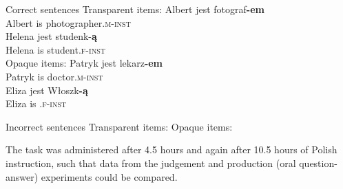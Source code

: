 \documentclass[output=paper,colorlinks,citecolor=brown,modfonts,nonflat]{../langscibook}
\begin{document}
\newpage

\ea%
    \label{ex:watorek:1}
    Correct sentences
    \ea%
    \label{ex:watorek:1a}
    Transparent items:
        \ea%
        \label{ex:watorek:1ai}
        \gll    Albert jest fotograf\textbf{{-em}}\\
                Albert is photographer\textsc{.m-inst}\\
        \ex%
        \label{ex:watorek:1aii}
        \gll    Helena jest studenk-\textbf{{ą}}\\
                Helena is student\textsc{.f-inst}\\
        \z
    \ex%
    \label{ex:watorek:1b}
    Opaque items:
        \ea%
        \label{ex:watorek:1bi}
        \gll    Patryk jest lekarz\textbf{{-em}}\\
                Patryk is doctor\textsc{.m-inst}\\
        \ex%
        \label{ex:watorek:1bii}
        \gll    Eliza jest Włoszk\textbf{{-ą}}\\
                Eliza is \textsc{.f-inst}\\
        \z
    \z
\z

\ea%
    \label{ex:watorek:2}
    Incorrect sentences
    \ea%
    \label{ex:watorek:2a}
    Transparent items:
        \z
    \ex%
    \label{ex:watorek:2b}
    Opaque items:
        \z
    \z
\z

The task was administered after 4.5 hours and again after 10.5 hours of Polish instruction, such that data from the judgement and production (oral question-answer) experiments could be compared. 
\end{document}
